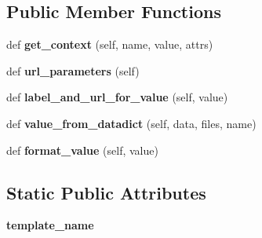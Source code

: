 \subsection*{Public Member Functions}
\begin{DoxyCompactItemize}
\item 
\mbox{\label{classdjango_1_1contrib_1_1admin_1_1widgets_1_1_many_to_many_raw_id_widget_a452fad84c1e48211d69ce1d2d629f34a}} 
def {\bfseries get\+\_\+context} (self, name, value, attrs)
\item 
\mbox{\label{classdjango_1_1contrib_1_1admin_1_1widgets_1_1_many_to_many_raw_id_widget_af87041c5f90549445f418db91ab909b7}} 
def {\bfseries url\+\_\+parameters} (self)
\item 
\mbox{\label{classdjango_1_1contrib_1_1admin_1_1widgets_1_1_many_to_many_raw_id_widget_ad6b70a32c117612d819babdf706122e9}} 
def {\bfseries label\+\_\+and\+\_\+url\+\_\+for\+\_\+value} (self, value)
\item 
\mbox{\label{classdjango_1_1contrib_1_1admin_1_1widgets_1_1_many_to_many_raw_id_widget_a9eb69a7732a280d3d9ca33302b839a6e}} 
def {\bfseries value\+\_\+from\+\_\+datadict} (self, data, files, name)
\item 
\mbox{\label{classdjango_1_1contrib_1_1admin_1_1widgets_1_1_many_to_many_raw_id_widget_a1391c370d280c34a648b2aff35054acc}} 
def {\bfseries format\+\_\+value} (self, value)
\end{DoxyCompactItemize}
\subsection*{Static Public Attributes}
\begin{DoxyCompactItemize}
\item 
\mbox{\label{classdjango_1_1contrib_1_1admin_1_1widgets_1_1_many_to_many_raw_id_widget_aca2cb5b31a7cbd73293524d7fdfcc666}} 
{\bfseries template\+\_\+name}
\end{DoxyCompactItemize}
